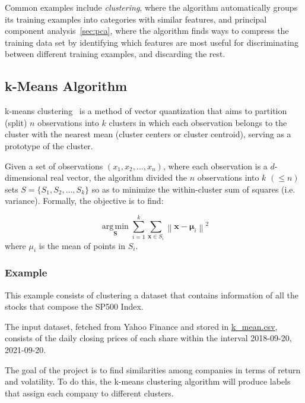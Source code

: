 Common examples include \emph{clustering}, where the algorithm automatically groups its training examples into categories with similar features, and principal component analysis~\ref{sec:pca}, where the algorithm finds ways to compress the training data set by identifying which features are most useful for discriminating between different training examples, and discarding the rest. 
    
\subsection{k-Means Algorithm}
    
k-means clustering~\cite{bib:k-means} is a method of vector quantization that aims to partition (split) $n$ observations into $k$ clusters in which each observation belongs to the cluster with the nearest mean (cluster centers or cluster centroid), serving as a prototype of the cluster. 
    
Given a set of observations $(x_1, x_2, \ldots, x_n)$, where each observation is a $d$-dimensional real vector, the algorithm divided the $n$ observations into $k$ $(\leq n)$ sets $S = \{S_1, S_2, \ldots, S_k\}$ so as to minimize the within-cluster sum of squares (i.e. variance). Formally, the objective is to find:
    
\begin{equation}
\underset {\mathbf {S}}{\operatorname {arg\,min} } \sum _{i=1}^{k}\sum _{\mathbf {x} \in S_{i}}\left\|\mathbf {x} -{\boldsymbol {\mu }}_{i}\right\|^{2}
\end{equation}
where $\mu_i$ is the mean of points in $S_i$. 
    
\subsubsection{Example}
This example consists of clustering a dataset that contains information of all the stocks that compose the SP500 Index. 
    
The input dataset, fetched from Yahoo Finance and stored in \href{https://github.com/matteosan1/finance_course/raw/develop/libro/input_files/k\_mean.csv}{k\_mean.csv}, consists of the daily closing prices of each share within the interval 2018-09-20, 2021-09-20.
    
The goal of the project is to find similarities among companies in terms of return and volatility. To do this, the k-means clustering algorithm will produce labels that assign each company to different clusters.
 
